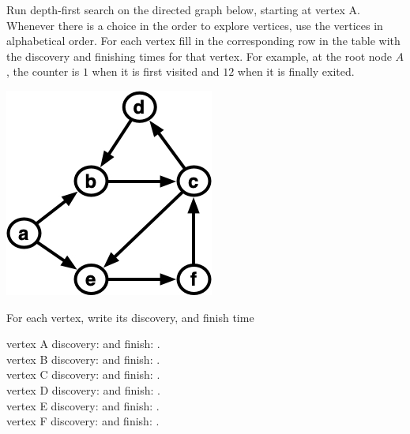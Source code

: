 Run depth-first search on the directed graph below, starting at vertex
A. Whenever there is a choice in the order to explore vertices, use
the vertices in alphabetical order.
For each vertex fill in the corresponding row in the
table with the discovery and finishing
times for that vertex. For example, at the root node $A$, the
counter is $1$ when it is first visited and $12$ when it is finally exited.



\vspace{.1in}
\noindent
\begin{minipage}{.45\textwidth}
\begin{center}
  \includegraphics[scale=.45]{media/dfs-numbers.jpg}\\[.2in]
\end{center}
\end{minipage}



\begin{problem}
For each vertex, write its discovery, and finish time

\ask vertex A \sols discovery:  and  finish: . 
\\
\ask vertex B \sols discovery:   and  finish: .
\\
\ask vertex C \sols discovery:  and finish: .
\\
\ask vertex D \sols discovery:  and finish:  .
\\
\ask vertex E \sols discovery:  and finish: .
\\
\ask vertex F \sols discovery:   and finish: .
\end{problem}


